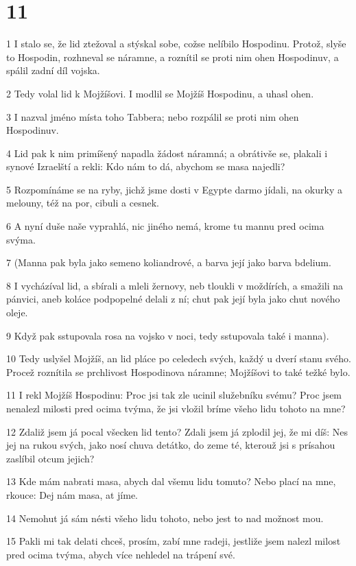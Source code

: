 \chapter{11}

\par 1 I stalo se, že lid ztežoval a stýskal sobe, cožse nelíbilo Hospodinu. Protož, slyše to Hospodin, rozhneval se náramne, a roznítil se proti nim ohen Hospodinuv, a spálil zadní díl vojska.
\par 2 Tedy volal lid k Mojžíšovi. I modlil se Mojžíš Hospodinu, a uhasl ohen.
\par 3 I nazval jméno místa toho Tabbera; nebo rozpálil se proti nim ohen Hospodinuv.
\par 4 Lid pak k nim primíšený napadla žádost náramná; a obrátivše se, plakali i synové Izraelští a rekli: Kdo nám to dá, abychom se masa najedli?
\par 5 Rozpomínáme se na ryby, jichž jsme dosti v Egypte darmo jídali, na okurky a melouny, též na por, cibuli a cesnek.
\par 6 A nyní duše naše vyprahlá, nic jiného nemá, krome tu mannu pred ocima svýma.
\par 7 (Manna pak byla jako semeno koliandrové, a barva její jako barva bdelium.
\par 8 I vycházíval lid, a sbírali a mleli žernovy, neb tloukli v moždírích, a smažili na pánvici, aneb koláce podpopelné delali z ní; chut pak její byla jako chut nového oleje.
\par 9 Když pak sstupovala rosa na vojsko v noci, tedy sstupovala také i manna).
\par 10 Tedy uslyšel Mojžíš, an lid pláce po celedech svých, každý u dverí stanu svého. Procež roznítila se prchlivost Hospodinova náramne; Mojžíšovi to také težké bylo.
\par 11 I rekl Mojžíš Hospodinu: Proc jsi tak zle ucinil služebníku svému? Proc jsem nenalezl milosti pred ocima tvýma, že jsi vložil bríme všeho lidu tohoto na mne?
\par 12 Zdaliž jsem já pocal všecken lid tento? Zdali jsem já zplodil jej, že mi díš: Nes jej na rukou svých, jako nosí chuva detátko, do zeme té, kterouž jsi s prísahou zaslíbil otcum jejich?
\par 13 Kde mám nabrati masa, abych dal všemu lidu tomuto? Nebo plací na mne, rkouce: Dej nám masa, at jíme.
\par 14 Nemohut já sám nésti všeho lidu tohoto, nebo jest to nad možnost mou.
\par 15 Pakli mi tak delati chceš, prosím, zabí mne radeji, jestliže jsem nalezl milost pred ocima tvýma, abych více nehledel na trápení své.
